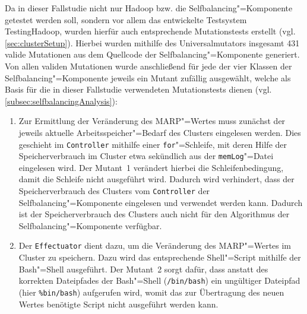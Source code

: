 Da in dieser Fallstudie nicht nur Hadoop bzw. die Selfbalancing"=Komponente getestet werden soll, sondern vor allem das entwickelte Testsystem TestingHadoop, wurden hierfür auch entsprechende Mutationstests erstellt (vgl. \cref{sec:clusterSetup}).
Hierbei wurden mithilfe des Universalmutators insgesamt 431 valide Mutationen aus dem Quellcode der Selfbalancing"=Komponente generiert.
Von allen validen Mutationen wurde anschließend für jede der vier Klassen der Selfbalancing"=Komponente jeweils ein Mutant zufällig ausgewählt, welche als Basis für die in dieser Fallstudie verwendeten Mutationstests dienen (vgl. \cref{subsec:selfbalancingAnalysis}):

\begin{enumerate}[itemsep=5pt]
    \item
    Zur Ermittlung der Veränderung des \gls{MARP}"=Wertes muss zunächst der jeweils aktuelle Arbeitsspeicher"=Bedarf des Clusters eingelesen werden.
    Dies geschieht im \texttt{Controller} mithilfe einer \texttt{for}"=Schleife, mit deren Hilfe der Speicherverbrauch im Cluster etwa sekündlich aus der \texttt{memLog}"=Datei eingelesen wird.
    Der Mutant~1 verändert hierbei die Schleifenbedingung, damit die Schleife nicht ausgeführt wird.
    Dadurch wird verhindert, dass der Speicherverbrauch des Clusters vom \texttt{Controller} der Selfbalancing"=Komponente eingelesen und verwendet werden kann.
    Dadurch ist der Speicherverbrauch des Clusters auch nicht für den Algorithmus \cite{Zhang2016} der Selfbalancing"=Komponente verfügbar.
    
    \item 
    Der \texttt{Effectuator} dient dazu, um die Veränderung des \gls{MARP}"=Wertes im Cluster zu speichern.
    Dazu wird das entsprechende Shell"=Script mithilfe der Bash"=Shell ausgeführt.
    Der Mutant~2 sorgt dafür, dass anstatt des korrekten Dateipfades der Bash"=Shell (\texttt{/bin/bash}) ein ungültiger Dateipfad (hier \texttt{\%bin/bash}) aufgerufen wird, womit das zur Übertragung des neuen Wertes benötigte Script nicht ausgeführt werden kann.
    

\end{enumerate}
